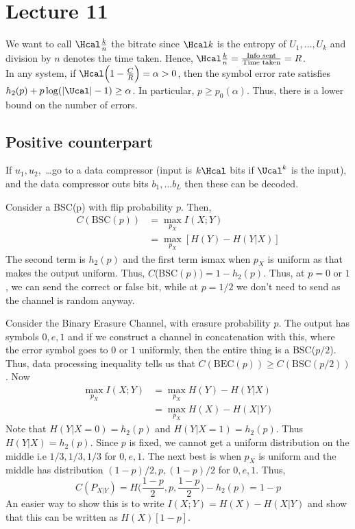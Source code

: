 \chapter{Lecture 11}
We want to call $\Hcal \frac{k}{n}$ the bitrate since $\Hcal k$ is the entropy of $U_1, \dots, U_k$ and division by $n$ denotes the time taken. Hence, $\Hcal \frac{k}{n} = \frac{\text{Info sent}}{\text{Time taken}} = R$.\\
In any system, if $\Hcal\Big(1-\frac{C}{R}\Big) = \alpha > 0$, then the symbol error rate satisfies $h_2(p) + p\log(|\Ucal|-1) \geq \alpha$. In particular, $p \geq p_0(\alpha)$. Thus, there is a lower bound on the number of errors.
\section{Positive counterpart}
If $u_1, u_2,$ \dots go to a data compressor (input is $k\Hcal$ bits if $\Ucal^k$ is the input), and the data compressor outs bits $b_1, \dots b_L$ then these can be decoded.
\begin{eg}
Consider a BSC(p) with flip probability $p$. Then,
\begin{align*}
    C(\text{BSC}(p)) &= \max_{p_X} I(X;Y) \\
    &= \max_{p_X} [H(Y) - H(Y|X)] 
\end{align*}
The second term is $h_2(p)$ and the first term ismax when $p_X$ is uniform as that makes the output uniform. Thus, $C$(BSC$(p)) = 1 - h_2(p)$. Thus, at $p=0$ or $1$, we can send the correct or false bit, while at $p=1/2$ we don't need to send as the channel is random anyway.
\end{eg}
\begin{eg}
Consider the Binary Erasure Channel, with erasure probability $p$. The output has symbols $0, e, 1$ and if we construct a channel in concatenation with this, where the error symbol goes to $0$ or $1$ uniformly, then the entire thing is a BSC($p/2$). Thus, data processing inequality tells us that $C(\text{BEC}(p)) \geq C(\text{BSC}(p/2))$. Now
\begin{align*}
    \max_{p_X} I(X;Y) &= \max_{p_X} H(Y) - H(Y|X) \\
    &= \max_{p_X} H(X) - H(X|Y)
\end{align*}
Note that $H(Y|X=0) = h_2(p)$ and $H(Y|X=1) = h_2(p)$. Thus $H(Y|X) = h_2(p)$. Since $p$ is fixed, we cannot get a uniform distribution on the middle i.e $1/3, 1/3, 1/3$ for $0,e,1$. The next best is when $p_X$ is uniform and the middle has distribution $(1-p)/2, p, (1-p)/2$ for $0,e,1$. Thus,
\[C(P_{X|Y}) = H\bigg(\frac{1-p}2, p, \frac{1-p}2\bigg) - h_2(p) = 1-p\]
An easier way to show this is to write $I(X;Y) = H(X) - H(X|Y)$ and show that this can be written as $H(X)[1-p]$.
\end{eg}
